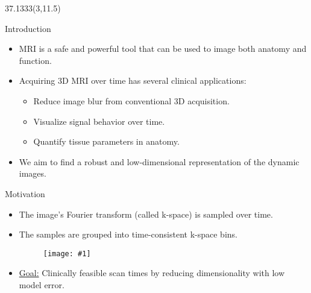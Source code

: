 \documentclass[t]{beamer}
\newcommand{\n}{\par \smallskip}
\newcommand{\imgnobox}[2]{\begin{figure}[htp]\texttt{[image: \#1]}\end{figure}}
\newcommand{\colwidth}{37.1333}
\begin{document}
{%




\begin{textblock}{\colwidth}(3,11.5)
  \begin{frame}
  
  \begin{block}{Introduction}
  \begin{itemize}
  \item MRI is a safe and powerful tool that can be used to
  image both anatomy and function. 
  \item Acquiring 3D MRI over time has several clinical applications:
    \begin{itemize}
    \item Reduce image blur from conventional 3D acquisition.
    \item Visualize signal behavior over time.
    \item Quantify tissue parameters in anatomy.
    \end{itemize}
  \item We aim to find a robust and low-dimensional representation of 
  the dynamic images.
  \end{itemize}
  \end{block}
  
  \begin{block}{Motivation}
  \begin{itemize}
  \item The image's Fourier transform (called k-space) is sampled over time. 
  \item The samples are grouped into time-consistent k-space bins.
  \imgnobox{acq_over_time.png}{0.9}\n
  \item \underline{Goal:} Clinically feasible scan times by reducing dimensionality with low model error.
  \end{itemize}
  \end{block}
  

\end{frame}
\end{textblock}}
\end{document}
